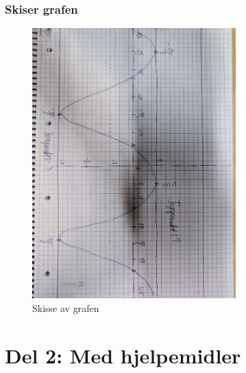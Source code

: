 \documentclass{article}
\begin{document}
\subsubsection{Skiser grafen}

\begin{figure}[h]
    \centering
    \includegraphics[width=0.7\textwidth, angle=90]{tegning.png}
    \caption{Skisse av grafen}
\end{figure}

\section{Del 2: Med hjelpemidler}



\end{document}
